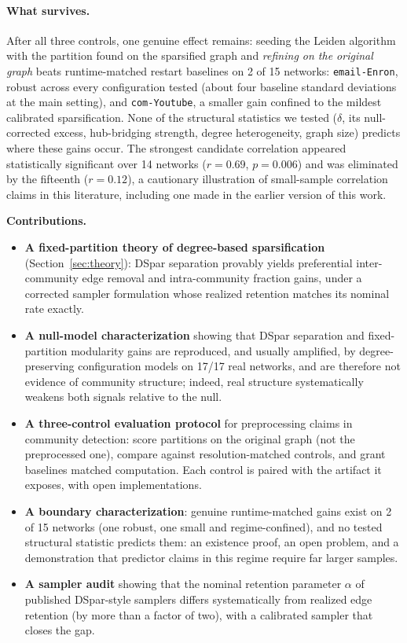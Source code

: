 \documentclass[10pt,journal,compsoc]{IEEEtran}
\begin{document}
\paragraph{What survives.}
After all three controls, one genuine effect remains: seeding the Leiden algorithm~\cite{traag2019louvain} with the partition found on the sparsified graph and \emph{refining on the original graph} beats runtime-matched restart baselines on 2 of 15 networks: \texttt{email-Enron}, robust across every configuration tested (about four baseline standard deviations at the main setting), and \texttt{com-Youtube}, a smaller gain confined to the mildest calibrated sparsification.
None of the structural statistics we tested ($\delta$, its null-corrected excess, hub-bridging strength, degree heterogeneity, graph size) predicts where these gains occur.
The strongest candidate correlation appeared statistically significant over 14 networks ($r = 0.69$, $p = 0.006$) and was eliminated by the fifteenth ($r = 0.12$), a cautionary illustration of small-sample correlation claims in this literature, including one made in the earlier version of this work.

\noindent\textbf{Contributions.}
\begin{itemize}
    \item \textbf{A fixed-partition theory of degree-based sparsification} (Section~\ref{sec:theory}): DSpar separation provably yields preferential inter-community edge removal and intra-community fraction gains, under a corrected sampler formulation whose realized retention matches its nominal rate exactly.

    \item \textbf{A null-model characterization} showing that DSpar separation and fixed-partition modularity gains are reproduced, and usually amplified, by degree-preserving configuration models on 17/17 real networks, and are therefore not evidence of community structure; indeed, real structure systematically weakens both signals relative to the null.

    \item \textbf{A three-control evaluation protocol} for preprocessing claims in community detection: score partitions on the original graph (not the preprocessed one), compare against resolution-matched controls, and grant baselines matched computation. Each control is paired with the artifact it exposes, with open implementations.

    \item \textbf{A boundary characterization}: genuine runtime-matched gains exist on 2 of 15 networks (one robust, one small and regime-confined), and no tested structural statistic predicts them: an existence proof, an open problem, and a demonstration that predictor claims in this regime require far larger samples.

    \item \textbf{A sampler audit} showing that the nominal retention parameter $\alpha$ of published DSpar-style samplers differs systematically from realized edge retention (by more than a factor of two), with a calibrated sampler that closes the gap.
\end{itemize}
\end{document}
